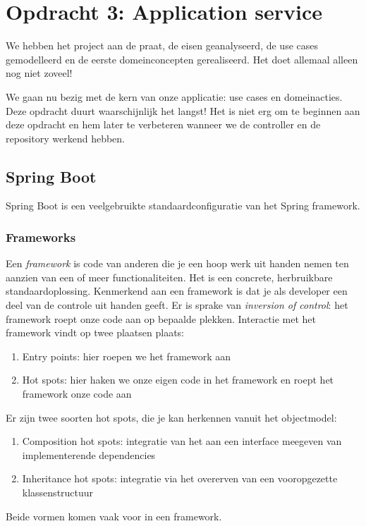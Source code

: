 \chapter{Opdracht 3: Application service}
We hebben het project aan de praat, de eisen geanalyseerd, 
de use cases gemodelleerd en de eerste domeinconcepten gerealiseerd. 
Het doet allemaal alleen nog niet zoveel!

We gaan nu bezig met de kern van onze applicatie:
use cases en domeinacties. Deze opdracht duurt waarschijnlijk het langst!
Het is niet erg om te beginnen aan deze opdracht en hem later te
verbeteren wanneer we de controller en de repository werkend hebben.

\section{Spring Boot}
Spring Boot is een veelgebruikte standaardconfiguratie van het Spring framework.

\subsection{Frameworks}
Een \textit{framework} is code van anderen die je een hoop werk uit handen 
nemen ten aanzien van een of meer functionaliteiten. Het is een concrete, herbruikbare standaardoplossing.
Kenmerkend aan een framework is dat je als developer een deel van de controle 
uit handen geeft. Er is sprake van \textit{inversion of control}: het framework 
roept onze code aan op bepaalde plekken. Interactie met het framework vindt op twee plaatsen 
plaats:
\begin{enumerate}
    \item Entry points: hier roepen we het framework aan
    \item Hot spots: hier haken we onze eigen code in het framework en roept het framework onze code aan
\end{enumerate}

Er zijn twee soorten hot spots, die je kan herkennen vanuit het objectmodel:
\begin{enumerate}
    \item Composition hot spots: integratie van het aan een interface meegeven 
    van implementerende dependencies
    \item Inheritance hot spots: integratie via het overerven 
    van een vooropgezette klassenstructuur
\end{enumerate}

Beide vormen komen vaak voor in een framework.

